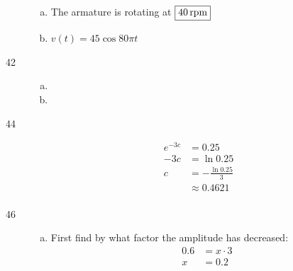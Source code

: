 \documentclass{exam}
\begin{document}
\begin{description}
\begin{enumerate}[(a)]
          \item The armature is rotating at $\boxed{ \unit[ 40 ]{rpm} }$

          \item $\boxed{ v(t) = 45 \cos 80 \pi t }$

        \end{enumerate}

      \item[42]
        \begin{enumerate}[(a)]
          \item 

          \item 

        \end{enumerate}

      \item[44]
        \begin{align*}
          e^{-3c} & = 0.25 \\
          -3c     & = \ln 0.25 \\
          c       & = - \frac{\ln 0.25}{3} \\
                  & \approx \boxed{ 0.4621 } \\
        \end{align*}

      \item[46]
        \begin{enumerate}[(a)]
          \item 
            First find by what factor the amplitude has decreased:
            \begin{align*}
              0.6 & = x \cdot 3 \\
              x   & = 0.2 \\
            \end{align*}


\end{enumerate}
\end{description}
\end{document}
